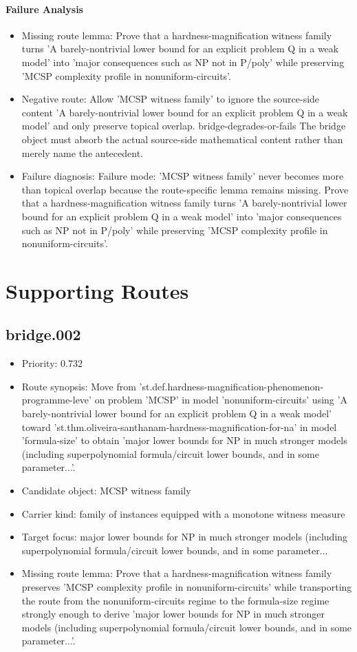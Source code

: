\documentclass[11pt]{article}
\begin{document}
\paragraph{Failure Analysis}
\begin{itemize}[leftmargin=*,itemsep=0.2em]
\item Missing route lemma: Prove that a hardness-magnification witness family turns 'A barely-nontrivial lower bound for an explicit problem Q in a weak model' into 'major consequences such as NP not in P/poly' while preserving 'MCSP complexity profile in nonuniform-circuits'.
\item Negative route: Allow 'MCSP witness family' to ignore the source-side content 'A barely-nontrivial lower bound for an explicit problem Q in a weak model' and only preserve topical overlap. bridge-degrades-or-fails The bridge object must absorb the actual source-side mathematical content rather than merely name the antecedent.
\item Failure diagnosis: Failure mode: 'MCSP witness family' never becomes more than topical overlap because the route-specific lemma remains missing. Prove that a hardness-magnification witness family turns 'A barely-nontrivial lower bound for an explicit problem Q in a weak model' into 'major consequences such as NP not in P/poly' while preserving 'MCSP complexity profile in nonuniform-circuits'.
\end{itemize}

\section{Supporting Routes}
\subsection*{bridge.002}
\begin{itemize}[leftmargin=*,itemsep=0.2em]
\item Priority: 0.732
\item Route synopsis: Move from 'st.def.hardness-magnification-phenomenon-programme-leve' on problem 'MCSP' in model 'nonuniform-circuits' using 'A barely-nontrivial lower bound for an explicit problem Q in a weak model' toward 'st.thm.oliveira-santhanam-hardness-magnification-for-na' in model 'formula-size' to obtain 'major lower bounds for NP in much stronger models (including superpolynomial formula/circuit lower bounds, and in some parameter...'.
\item Candidate object: MCSP witness family
\item Carrier kind: family of instances equipped with a monotone witness measure
\item Target focus: major lower bounds for NP in much stronger models (including superpolynomial formula/circuit lower bounds, and in some parameter...
\item Missing route lemma: Prove that a hardness-magnification witness family preserves 'MCSP complexity profile in nonuniform-circuits' while transporting the route from the nonuniform-circuits regime to the formula-size regime strongly enough to derive 'major lower bounds for NP in much stronger models (including superpolynomial formula/circuit lower bounds, and in some parameter...'.
\end{itemize}
\end{document}
